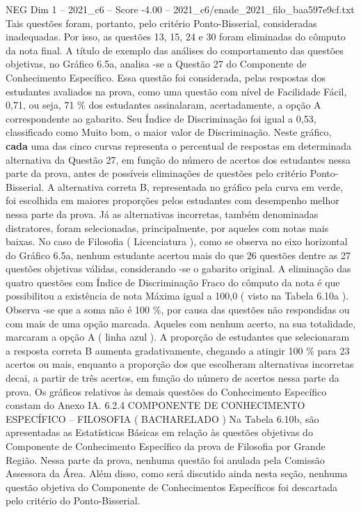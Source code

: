 \begin{textsample}{NEG Dim 1 – 2021\_c6 – Score -4.00 – 2021\_c6/enade\_2021\_filo\_baa597e9cf.txt}
Tais questões foram, portanto, pelo critério Ponto-Bisserial, consideradas inadequadas.
Por isso, as questões 13, 15, 24 e 30 foram eliminadas do cômputo da nota final.
A título de exemplo das análises do comportamento das questões objetivas, no Gráfico 6.5a, analisa -se a Questão 27 do Componente de Conhecimento Específico.
Essa questão foi considerada, pelas respostas dos estudantes avaliados na prova, como uma questão com nível de Facilidade Fácil, 0,71, ou seja, 71 \% dos estudantes assinalaram, acertadamente, a opção A correspondente ao gabarito.
Seu Índice de Discriminação foi igual a 0,53, classificado como Muito bom, o maior valor de Discriminação.
Neste gráfico, \textbf{cada} uma das cinco curvas representa o percentual de respostas em determinada alternativa da Questão 27, em função do número de acertos dos estudantes nessa parte da prova, antes de possíveis eliminações de questões pelo critério Ponto-Bisserial.
A alternativa correta B, representada no gráfico pela curva em verde, foi escolhida em maiores proporções pelos estudantes com desempenho melhor nessa parte da prova.
Já as alternativas incorretas, também denominadas distratores, foram selecionadas, principalmente, por aqueles com notas mais baixas.
No caso de Filosofia ( Licenciatura ), como se observa no eixo horizontal do Gráfico 6.5a, nenhum estudante acertou mais do que 26 questões dentre as 27 questões objetivas válidas, considerando -se o gabarito original.
A eliminação das quatro questões com Índice de Discriminação Fraco do cômputo da nota é que possibilitou a existência de nota Máxima igual a 100,0 ( visto na Tabela 6.10a ).
Observa -se que a soma não é 100 \%, por causa das questões não respondidas ou com mais de uma opção marcada.
Aqueles com nenhum acerto, na sua totalidade, marcaram a opção A ( linha azul ).
A proporção de estudantes que selecionaram a resposta correta B aumenta gradativamente, chegando a atingir 100 \% para 23 acertos ou mais, enquanto a proporção dos que escolheram alternativas incorretas decai, a partir de três acertos, em função do número de acertos nessa parte da prova.
Os gráficos relativos às demais questões do Conhecimento Específico constam do Anexo IA. 6.2.4 COMPONENTE DE CONHECIMENTO ESPECÍFICO – FILOSOFIA ( BACHARELADO ) Na Tabela 6.10b, são apresentadas as Estatísticas Básicas em relação às questões objetivas do Componente de Conhecimento Específico da prova de Filosofia por Grande Região.
Nessa parte da prova, nenhuma questão foi anulada pela Comissão Assessora da Área.
Além disso, como será discutido ainda nesta seção, nenhuma questão objetiva do Componente de Conhecimentos Específicos foi descartada pelo critério do Ponto-Bisserial.

\end{textsample}
